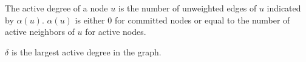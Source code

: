 \begin{ldef}
The active degree of a node $u$ is the number of unweighted edges of $u$ indicated by $\alpha(u)$. $\alpha(u)$ is either 0 for committed nodes or equal to the number of active neighbors of $u$ for active nodes.
\end{ldef}
\begin{ldef}
$\delta$ is the largest active degree in the graph.
\end{ldef}
